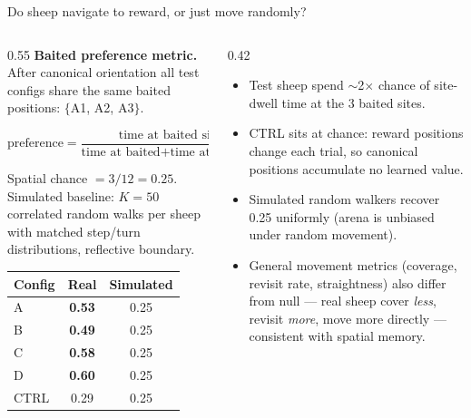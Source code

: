 \documentclass[aspectratio=169, 10pt]{beamer}
\begin{document}
\begin{frame}{Do sheep navigate to reward, or just move randomly?}
\begin{columns}[T]
\begin{column}{0.55\textwidth}
\textbf{Baited preference metric.}
After canonical orientation all test configs share the same baited
positions: $\{$A1, A2, A3$\}$.

\vspace{0.3em}
$\text{preference} = \dfrac{\text{time at baited sites}}{\text{time at baited} + \text{time at unbaited}}$

\vspace{0.3em}
Spatial chance $= 3/12 = 0.25$.
Simulated baseline: $K=50$ correlated random walks per sheep with
matched step/turn distributions, reflective boundary.

\vspace{0.4em}
\begin{tabular}{l c c}
\toprule
\textbf{Config} & \textbf{Real} & \textbf{Simulated} \\
\midrule
A & \textbf{0.53} & 0.25 \\
B & \textbf{0.49} & 0.25 \\
C & \textbf{0.58} & 0.25 \\
D & \textbf{0.60} & 0.25 \\
\midrule
CTRL & 0.29 & 0.25 \\
\bottomrule
\end{tabular}
\end{column}
\begin{column}{0.42\textwidth}
\vspace{0.8em}
\begin{itemize}\setlength\itemsep{0.15em}
    \item Test sheep spend $\sim$2$\times$ chance of site-dwell time
          at the 3 baited sites.
    \item CTRL sits at chance: reward positions change each trial,
          so canonical positions accumulate no learned value.
    \item Simulated random walkers recover 0.25 uniformly
          (arena is unbiased under random movement).
    \item General movement metrics (coverage, revisit rate,
          straightness) also differ from null --- real sheep
          cover \emph{less}, revisit \emph{more}, move more
          directly --- consistent with spatial memory.
\end{itemize}
\end{column}
\end{columns}
\end{frame}
\end{document}
